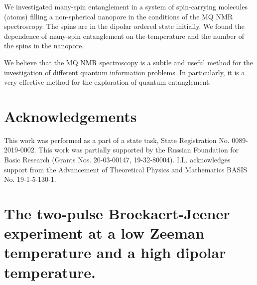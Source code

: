 \documentclass[review]{elsarticle}
\begin{document}
We investigated many-spin entanglement in a system of spin-carrying molecules (atoms) filling a non-spherical nanopore in the conditions of the MQ NMR spectroscopy. The spins are in the dipolar ordered state initially.
We found the dependence of many-spin entanglement on the temperature and the number of the spins in the nanopore.

We believe that the MQ NMR spectroscopy is a subtle and useful method for the investigation of different quantum information problems.
In particularly, it is a very effective method for the exploration of quantum entanglement.



\section{Acknowledgements}
This work was performed as a part of a state task, State Registration No. 0089-2019-0002. 
This work was partially supported by the Russian Foundation for Basic Research (Grants Nos. 20-03-00147, 19-32-80004). 
I.L. acknowledges support from the Advancement of Theoretical Physics and Mathematics BASIS No. 19-1-5-130-1.



\appendix
\section{The two-pulse Broekaert-Jeener experiment at a low Zeeman temperature and a high dipolar temperature.}
\end{document}
